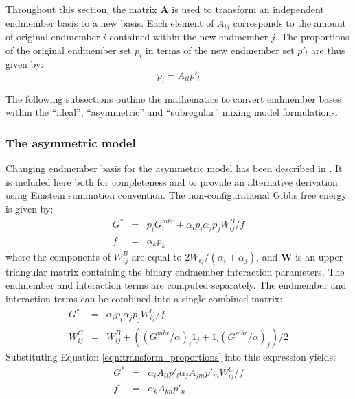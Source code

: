 \documentclass[preprint,12pt]{elsarticle}
\begin{document}
Throughout this section, the matrix $\boldsymbol{A}$ is used to transform an independent endmember basis to a new basis. Each element of $A_{ij}$ corresponds to the amount of original endmember $i$ contained within the new endmember $j$. The proportions of the original endmember set $p_i$ in terms of the new endmember set $p'_l$ are thus given by:
\begin{equation}
    p_i = A_{il}p'_l
\label{eqn:transform_proportions}
\end{equation}

The following subsections outline the mathematics to convert endmember bases within the ``ideal'', ``asymmetric'' and ``subregular'' mixing model formulations.

\subsubsection{The asymmetric model}
Changing endmember basis for the asymmetric model has been described in \citep{Diener2007}. It is included here both for completeness and to provide an alternative derivation using Einstein summation convention. The non-configurational Gibbs free energy is given by:
\begin{eqnarray}
    G^* &=& p_i G^{mbr}_i + \alpha_i p_i \alpha_j p_j W_{ij}^B/f \label{eqn:asymmetric_gibbs}\\
    f &=& \alpha_k p_k
\end{eqnarray}
where the components of $W_{ij}^B$ are equal to $2 W_{ij} / (\alpha_i + \alpha_j)$, and $\boldsymbol{W}$ is an upper triangular matrix containing the binary endmember interaction parameters. The endmember and interaction terms are computed separately. The endmember and interaction terms can be combined into a single combined matrix:
\begin{eqnarray}
    G^* &=& \alpha_i p_i \alpha_j p_j W^C_{ij} / f\\
    W^C_{ij} &=& W_{ij}^B + ((G^{mbr}/\alpha)_i 1_j + 1_i (G^{mbr}/\alpha)_j)/2 \label{eqn:asymmetric_combined}
\end{eqnarray} 
Substituting Equation \ref{eqn:transform_proportions} into this expression yields:
\begin{eqnarray}
    G^* &=& \alpha_i A_{il}p'_l \alpha_j A_{jm}p'_m W_{ij}^C/f \\
    f &=& \alpha_k A_{kn}p'_n 
    \label{eqn:asymmetric_t1}
\end{eqnarray}
\end{document}
